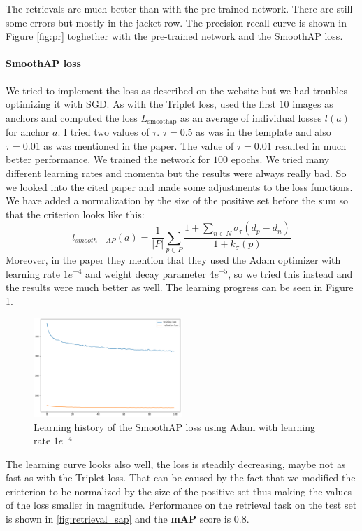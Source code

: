 \documentclass[a4paper,11pt]{article}
\begin{document}
The retrievals are much better than with the pre-trained network.
There are still some errors but mostly in the jacket row.
The precision-recall curve is shown in Figure \ref{fig:pr} toghether with the pre-trained network and the SmoothAP loss.

\paragraph{SmoothAP loss}
We tried to implement the loss as described on the website but we had troubles optimizing it with SGD.
As with the Triplet loss, used the first $10$ images as anchors and computed the loss $L_{\mathrm{smoothap}}$ as an average of individual losses $l(a)$ for anchor $a$.
I tried two values of $\tau$. $\tau=0.5$ as was in the template and also $\tau=0.01$ as was mentioned in the paper.
The value of $\tau=0.01$ resulted in much better performance.
We trained the network for $100$ epochs.
We tried many different learning rates and momenta but the results were always really bad.
So we looked into the cited paper and made some adjustments to the loss functions.
We have added a normalization by the size of the positive set before the sum so that the criterion looks like this:
$$
    l_{smooth-AP}(a) = \frac{1}{|P|} \sum_{p \in P} \frac{1 + \sum_{n \in N} \sigma_{\tau}(d_p - d_n)}{1 + k_{\sigma}(p)}
$$
Moreover, in the paper they mention that they used the Adam optimizer with learning rate $1e^{-4}$ and weight decay parameter $4e^{-5}$, so we tried this instead and the results were much better as well.
The learning progress can be seen in Figure \ref{fig:training_smoothap}.

\begin{figure}[ht]
    \centering
    \includegraphics[width=0.5\textwidth]{../outputs/learn_sap.png}
    \caption{Learning history of the SmoothAP loss using Adam with learning rate $1e^{-4}$}
    \label{fig:training_smoothap}
\end{figure}

The learning curve looks also well, the loss is steadily decreasing, maybe not as fast as with the Triplet loss.
That can be caused by the fact that we modified the crieterion to be normalized by the size of the positive set thus making the values of the loss smaller in magnitude.
Performance on the retrieval task on the test set is shown in \ref{fig:retrieval_sap} and the \textbf{mAP} score is $0.8$.
\end{document}
